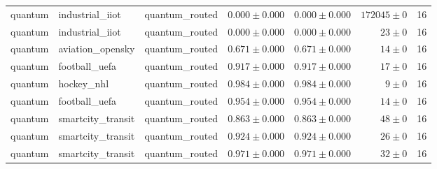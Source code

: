 \begin{table}[htbp]
\begin{tabular}{l l l r r r r}
quantum & industrial\_iiot & quantum\_routed & $0.000\pm0.000$ & $0.000\pm0.000$ & $172045\pm0$ & 16 \\
quantum & industrial\_iiot & quantum\_routed & $0.000\pm0.000$ & $0.000\pm0.000$ & $23\pm0$ & 16 \\
quantum & aviation\_opensky & quantum\_routed & $0.671\pm0.000$ & $0.671\pm0.000$ & $14\pm0$ & 16 \\
quantum & football\_uefa & quantum\_routed & $0.917\pm0.000$ & $0.917\pm0.000$ & $17\pm0$ & 16 \\
quantum & hockey\_nhl & quantum\_routed & $0.984\pm0.000$ & $0.984\pm0.000$ & $9\pm0$ & 16 \\
quantum & football\_uefa & quantum\_routed & $0.954\pm0.000$ & $0.954\pm0.000$ & $14\pm0$ & 16 \\
quantum & smartcity\_transit & quantum\_routed & $0.863\pm0.000$ & $0.863\pm0.000$ & $48\pm0$ & 16 \\
quantum & smartcity\_transit & quantum\_routed & $0.924\pm0.000$ & $0.924\pm0.000$ & $26\pm0$ & 16 \\
quantum & smartcity\_transit & quantum\_routed & $0.971\pm0.000$ & $0.971\pm0.000$ & $32\pm0$ & 16 \\
\hline
\end{tabular}
\end{table}
